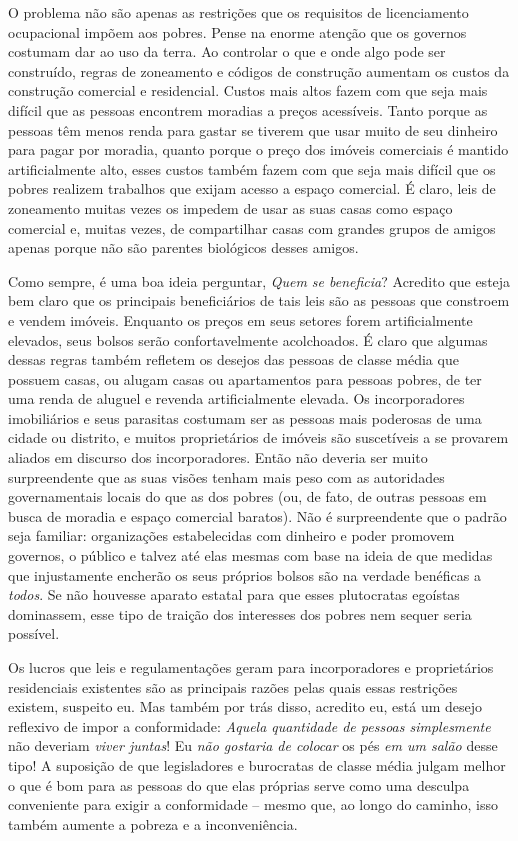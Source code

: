 O problema não são apenas as restrições que os requisitos de licenciamento ocupacional impõem aos pobres. Pense na enorme atenção que os governos costumam dar ao uso da terra. Ao controlar o que e onde algo pode ser construído, regras de zoneamento e códigos de construção aumentam os custos da construção comercial e residencial. Custos mais altos fazem com que seja mais difícil que as pessoas encontrem moradias a preços acessíveis. Tanto porque as pessoas têm menos renda para gastar se tiverem que usar muito de seu dinheiro para pagar por moradia, quanto porque o preço dos imóveis comerciais é mantido artificialmente alto, esses custos também fazem com que seja mais difícil que os pobres realizem trabalhos que exijam acesso a espaço comercial. É claro, leis de zoneamento muitas vezes os impedem de usar as suas casas como espaço comercial e, muitas vezes, de compartilhar casas com grandes grupos de amigos apenas porque não são parentes biológicos desses amigos.

Como sempre, é uma boa ideia perguntar, \emph{Quem se beneficia}? Acredito que esteja bem claro que os principais beneficiários de tais leis são as pessoas que constroem e vendem imóveis. Enquanto os preços em seus setores forem artificialmente elevados, seus bolsos serão confortavelmente acolchoados. É claro que algumas dessas regras também refletem os desejos das pessoas de classe média que possuem casas, ou alugam casas ou apartamentos para pessoas pobres, de ter uma renda de aluguel e revenda artificialmente elevada. Os incorporadores imobiliários e seus parasitas costumam ser as pessoas mais poderosas de uma cidade ou distrito, e muitos proprietários de imóveis são suscetíveis a se provarem aliados em discurso dos incorporadores. Então não deveria ser muito surpreendente que as suas visões tenham mais peso com as autoridades governamentais locais do que as dos pobres (ou, de fato, de outras pessoas em busca de moradia e espaço comercial baratos). Não é surpreendente que o padrão seja familiar: organizações estabelecidas com dinheiro e poder promovem governos, o público e talvez até elas mesmas com base na ideia de que medidas que injustamente encherão os seus próprios bolsos são na verdade benéficas a \emph{todos}. Se não houvesse aparato estatal para que esses plutocratas egoístas dominassem, esse tipo de traição dos interesses dos pobres nem sequer seria possível.

Os lucros que leis e regulamentações geram para incorporadores e proprietários residenciais existentes são as principais razões pelas quais essas restrições existem, suspeito eu. Mas também por trás disso, acredito eu, está um desejo reflexivo de impor a conformidade: \emph{Aquela quantidade de pessoas simplesmente} não deveriam \emph{viver juntas}! Eu \emph{não gostaria de colocar} os pés \emph{em um salão} desse tipo! A suposição de que legisladores e burocratas de classe média julgam melhor o que é bom para as pessoas do que elas próprias serve como uma desculpa conveniente para exigir a conformidade -- mesmo que, ao longo do caminho, isso também aumente a pobreza e a inconveniência.

